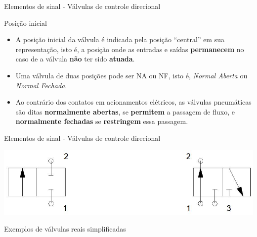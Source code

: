 \begin{frame}{Elementos de sinal - Válvulas de controle direcional}
	\begin{block}{Posição inicial}
		\begin{itemize}
			\item A posição inicial da válvula é indicada pela posição ``central'' em sua representação, isto é, a posição onde as entradas e saídas \textbf{permanecem }no caso de a válvula \textbf{não }ter sido \textbf{atuada}.
			\item Uma válvula de duas posições pode ser NA ou NF, isto é, \textit{Normal Aberta }ou \textit{Normal Fechada}.
			\item Ao contrário dos contatos em acionamentos elétricos, as válvulas pneumáticas são ditas \textbf{normalmente abertas}, se \textbf{permitem} a passagem de fluxo, e \textbf{normalmente fechadas} se \textbf{restringem} essa passagem.
		\end{itemize}
	\end{block}
\end{frame}


\begin{frame}{Elementos de sinal - Válvulas de controle direcional}
	
	\centering
	\includegraphics[width=0.9\linewidth]{Figuras/Ch14/fig08}
	
	\medskip
	
	Exemplos de válvulas reais simplificadas
\end{frame}


